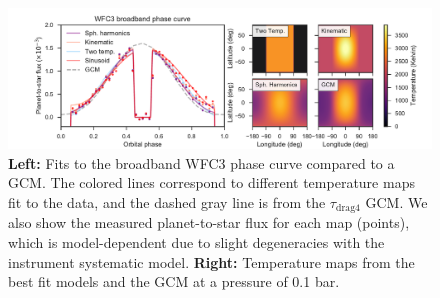 \documentclass[twocolumn]{aastex61}
\begin{document}
\begin{figure}
\includegraphics[width = 1.0\textwidth, trim={1.5cm 0 0.5cm 0},clip]{fig7.pdf}
\caption{\textbf{Left:} Fits to the broadband WFC3 phase curve compared to a GCM. The colored lines correspond to different temperature maps fit to the data, and the dashed gray line is from the $\tau_\mathrm{drag4}$ GCM. We also show the measured planet-to-star flux for each map (points), which is model-dependent due to slight degeneracies with the instrument systematic model.  \textbf{Right:} Temperature maps from the best fit models and the GCM at a pressure of 0.1 bar.}
\label{fig:model_comparison}
\end{figure}
\end{document}
